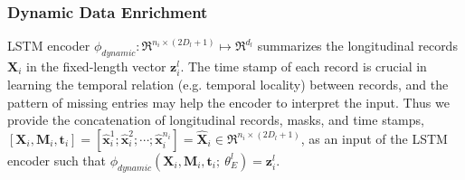 \subsubsection{Dynamic Data Enrichment}
LSTM encoder $\phi_{dynamic}: \Re^{n_i \times (2 D_l + 1)} \mapsto \Re^{d_l}$ summarizes the longitudinal records $\mathbf{X}_i$ in the fixed-length vector $\mathbf{z}_i^l$. The time stamp of each record is crucial in learning the temporal relation (e.g. temporal locality) between records, and the pattern of missing entries may help the encoder to interpret the input. Thus we provide the concatenation of longitudinal records, masks, and time stamps, $[\mathbf{X}_i, \mathbf{M}_i, \mathbf{t}_i] = [\hat{\mathbf{x}}_i^1; \hat{\mathbf{x}}_i^2; \cdots; \hat{\mathbf{x}}_i^{n_i}] = \hat{\mathbf{X}}_i \in \Re^{n_i \times (2 D_l + 1)}$, as an input of the LSTM encoder such that $\phi_{dynamic}(\mathbf{X}_i, \mathbf{M}_i, \mathbf{t}_i;\ \theta_{E}^l) = \mathbf{z}_i^l$. 

